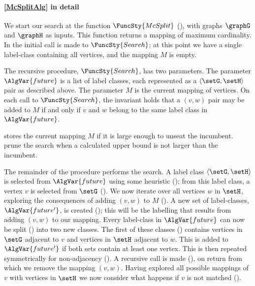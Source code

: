 \paragraph{\cref{McSplitAlg} in detail} We start our search at the function
$\FuncSty{McSplit}$ (),
with graphs $\graphG$ and $\graphH$ as inputs.  This function returns a mapping of
maximum cardinality.  In  the initial call is made to
$\FuncSty{Search}$; at this point we have a single label-class containing all
vertices, and the mapping $M$ is empty.

The recursive procedure,
$\FuncSty{Search}$, has two parameters.  The parameter $\AlgVar{future}$ is a
list of label classes, each represented as a $\langle \setG, \setH \rangle$ pair as
described above.  The parameter $M$ is the current mapping of vertices.  On
each call to $\FuncSty{Search}$, the invariant holds that a $(v,w)$ pair may be
added to $M$ if and only if $v$ and $w$ belong to the same label class in
$\AlgVar{future}$.

 stores the current mapping $M$ if it is large enough
to unseat the incumbent.   prune the
search when a calculated upper bound is not larger than the incumbent.

The remainder of the procedure performs the search.  A label class
$\langle \setG, \setH \rangle$ is selected from $\AlgVar{future}$
using some heuristic
(); from this label class, a vertex $v$ is selected
from $\setG$ (). We now iterate over all
vertices $w$ in $\setH$, exploring the consequences of adding $(v,w)$ to $M$
().  A new set of label-classes,
$\AlgVar{future'}$,
is created (); this will be the labelling that results
from adding $(v,w)$ to our mapping.  Every label-class in $\AlgVar{future}$ can
now be split () into two new classes. The
first of these classes ()
contains vertices in $\setG$ adjacent to $v$ and vertices in $\setH$ adjacent to $w$.
This is added to $\AlgVar{future'}$ if both sets contain at least one vertex.
This is then repeated symmetrically for non-adjacency
(). A recursive call is made
(), on return from which we remove the mapping $(v,w)$.
Having explored all possible mappings of $v$ with vertices in $\setH$ we now
consider what happens if $v$ is not matched
().

